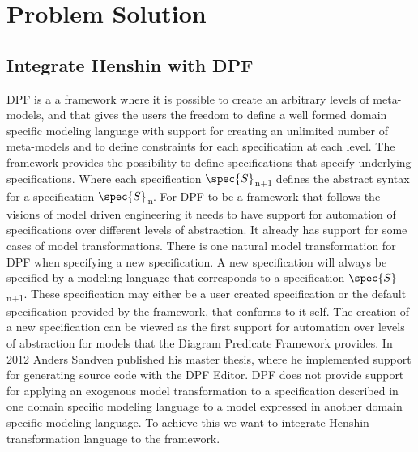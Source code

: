 
\chapter{Problem Solution} %

\label{Chapter6} %



\section{Integrate Henshin with DPF}

DPF is a a framework where it is possible to create an arbitrary levels of
meta-models, and that gives the users the freedom to define a well formed domain
specific modeling language with support for creating an unlimited number of
meta-models and to define constraints for each specification at each level. The
framework provides the possibility to define specifications that specify
underlying specifications. Where each specification
$\spec{S}$\textsubscript{n+1} defines the abstract syntax for a specification
$\spec{S}$\textsubscript{n}. For DPF to be a framework that follows the visions
of model driven engineering it needs to have support for automation of
specifications over different levels of abstraction. It already has support for
some cases of model transformations. There is one natural model transformation
for DPF when specifying a new specification. A new specification will always
be specified by a modeling language that corresponds to a specification
$\spec{S}$\textsubscript{n+1}. These specification may either be a user created
specification or the default specification provided by the framework, that
conforms to it self. The creation of a new specification can be viewed as the
first support for automation over levels of abstraction for models that the
Diagram Predicate Framework provides. In 2012 Anders Sandven published his
master thesis\cite{Sandven_thesis}, where he implemented support for generating
source code with the DPF Editor. DPF does not provide support for applying an
exogenous model transformation to a specification described in one domain
specific modeling language to a model expressed in another domain specific
modeling language. To achieve this we want to integrate Henshin transformation
language\cite{Arendt2010} to the framework.  

